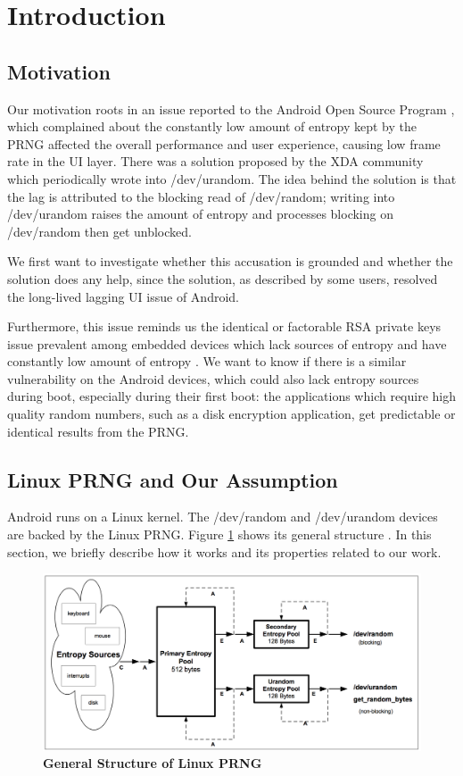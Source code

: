 \section{Introduction}
\subsection{Motivation}

Our motivation roots in an issue reported to the Android Open Source Program \cite{issue42265} , which complained about the constantly low amount of entropy kept by the PRNG affected the overall performance and user experience, causing low frame rate in the UI layer. There was a solution proposed by the XDA community which periodically wrote into /dev/urandom. The idea behind the solution is that the lag is attributed to the blocking read of /dev/random; writing into /dev/urandom raises the amount of entropy and processes blocking on /dev/random then get unblocked. 

We first want to investigate whether this accusation is grounded and whether the solution does any help, since the solution, as described by some users, resolved the long-lived lagging UI issue of Android.

Furthermore, this issue reminds us the identical or factorable RSA private keys issue prevalent among embedded devices which lack sources of entropy and have constantly low amount of entropy \cite{weakkeys12}. We want to know if there is a similar vulnerability on the Android devices, which could also lack entropy sources during boot, especially during their first boot: the applications which require high quality random numbers, such as a disk encryption application,  get predictable or identical results from the PRNG.

\subsection{Linux PRNG and Our Assumption}
Android runs on a Linux kernel. The /dev/random and /dev/urandom devices are backed by the Linux PRNG. Figure \ref{figprng} shows its general structure \cite{Gutterman06}. In this section, we briefly describe how it works and its properties related to our work.

\begin{figure}[t]
\begin{center}
\includegraphics[scale=0.27]{prng.png}
\end{center}
\caption{{\bf General Structure of Linux PRNG}}
\label{figprng}
\end{figure}


